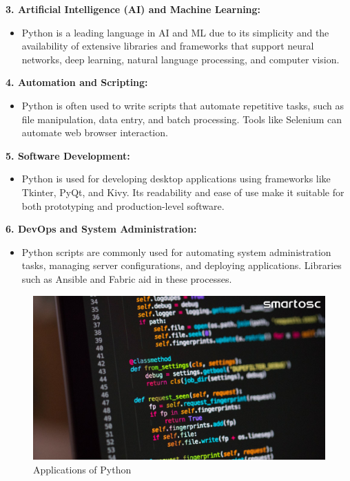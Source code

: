 \documentclass[12pt]{article}
\begin{document}
\textbf{3. Artificial Intelligence (AI) and Machine Learning:}
\begin{itemize}
    \item Python is a leading language in AI and ML due to its simplicity and the availability of extensive libraries and frameworks that support neural networks, deep learning, natural language processing, and computer vision.
\end{itemize}

\textbf{4. Automation and Scripting:}
\begin{itemize}
    \item Python is often used to write scripts that automate repetitive tasks, such as file manipulation, data entry, and batch processing. Tools like Selenium can automate web browser interaction.
\end{itemize}

\textbf{5. Software Development:}
\begin{itemize}
    \item Python is used for developing desktop applications using frameworks like Tkinter, PyQt, and Kivy. Its readability and ease of use make it suitable for both prototyping and production-level software.
\end{itemize}

\textbf{6. DevOps and System Administration:}
\begin{itemize}
    \item Python scripts are commonly used for automating system administration tasks, managing server configurations, and deploying applications. Libraries such as Ansible and Fabric aid in these processes.
\end{itemize}

\begin{figure}[h!]
\begin{center}
\includegraphics[width=14cm]{Python2.png}\\
Applications of Python
\end{center}
\end{figure}
\end{document}
